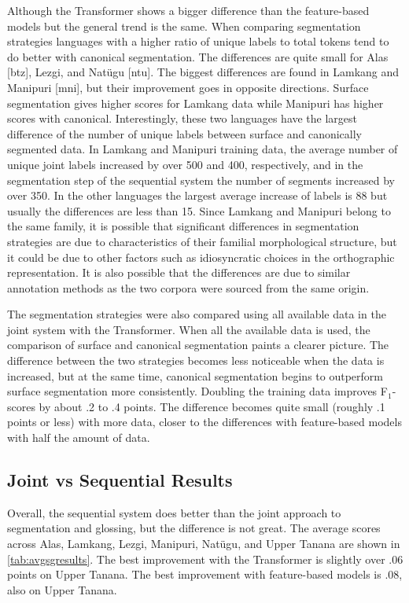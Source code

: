 Although the Transformer shows a bigger difference than the feature-based models but the general trend is the same. When comparing segmentation strategies languages with a higher ratio of unique labels to total tokens tend to do better with canonical segmentation. The differences are quite small for Alas [btz], Lezgi, and Nat\"ugu [ntu]. The biggest differences are found in Lamkang and Manipuri [mni], but their improvement goes in opposite directions. Surface segmentation gives higher scores for Lamkang data while Manipuri has higher scores with canonical. Interestingly, these two languages have the largest difference of the number of unique labels between surface and canonically segmented data. In Lamkang and Manipuri training data, the average number of unique joint labels increased by over 500 and 400, respectively, and in the segmentation step of the sequential system the number of segments increased by over 350. In the other languages the largest average increase of labels is 88 but usually the differences are less than 15. Since Lamkang and Manipuri belong to the same family, it is possible that significant differences in segmentation strategies are due to characteristics of their familial morphological structure, but it could be due to other factors such as idiosyncratic choices in the orthographic representation. 
It is also possible that the differences are due to similar annotation methods as the two corpora were sourced from the same origin. %

The segmentation strategies were also compared using all available data in the joint system with the Transformer.  When all the available data is used, the comparison of surface and canonical segmentation paints a clearer picture. The difference between the two strategies becomes less noticeable when the data is increased, but at the same time, canonical segmentation begins to outperform surface segmentation more consistently.  
Doubling the training data improves F$_1$-scores by about .2 to .4 points. The difference becomes quite small (roughly .1 points or less) with more data, closer to the differences with feature-based models with half the amount of data. 


\subsection{Joint vs Sequential Results}

Overall, the sequential system does better than the joint approach to segmentation and glossing, but the difference is not great. The average scores across Alas, Lamkang, Lezgi, Manipuri, Nat\"ugu, and Upper Tanana are shown in \autoref{tab:avgsgresults}. The best improvement with the Transformer is slightly over .06 points on Upper Tanana. The best improvement with feature-based models is .08, also on Upper Tanana. 

